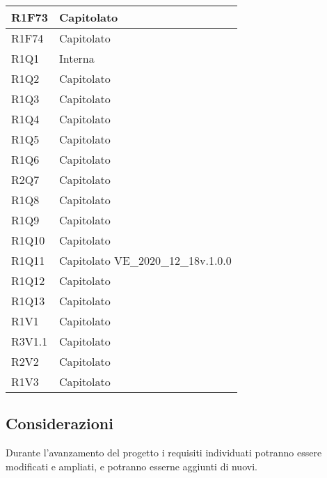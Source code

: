 \begin{center}
\begin{longtable}{|p{22mm}|p{44mm}|}
		R1F73 &
		Capitolato 
		\\
		\hline
		
		R1F74 &
		Capitolato 
		\\
		\hline
		
		R1Q1 &
		Interna 
		\\
		\hline
		
		R1Q2 &
		Capitolato 
		\\
		\hline
		
		R1Q3 &
		Capitolato 
		\\
		\hline
		
		R1Q4 &
		Capitolato 
		\\
		\hline
		
		R1Q5 &
		Capitolato 
		\\
		\hline
		
		R1Q6 &
		Capitolato 
		\\
		\hline
		
		R2Q7 &
		Capitolato 
		\\
		\hline
		
		R1Q8 &
		Capitolato 
		\\
		\hline
		
		R1Q9 &
		Capitolato 
		\\
		\hline
		
		R1Q10 &
		Capitolato 
		\\
		\hline
		
		R1Q11 &
		Capitolato \newline
		VE\_2020\_12\_18v.1.0.0 
		\\
		\hline
		
		R1Q12 &
		Capitolato 
		\\
		\hline
		
		R1Q13 &
		Capitolato 
		\\
		\hline
		
		R1V1 &
		Capitolato 
		\\
		\hline
		
		R3V1.1 &
		Capitolato 
		\\
		\hline
		
		R2V2 &
		Capitolato 
		\\
		\hline
		
		R1V3 &
		Capitolato 
		\\
		\hline%
		
	\end{longtable}
\end{center}

\subsection{Considerazioni}
Durante l'avanzamento del progetto i requisiti individuati potranno essere modificati e ampliati, e potranno esserne aggiunti di nuovi.